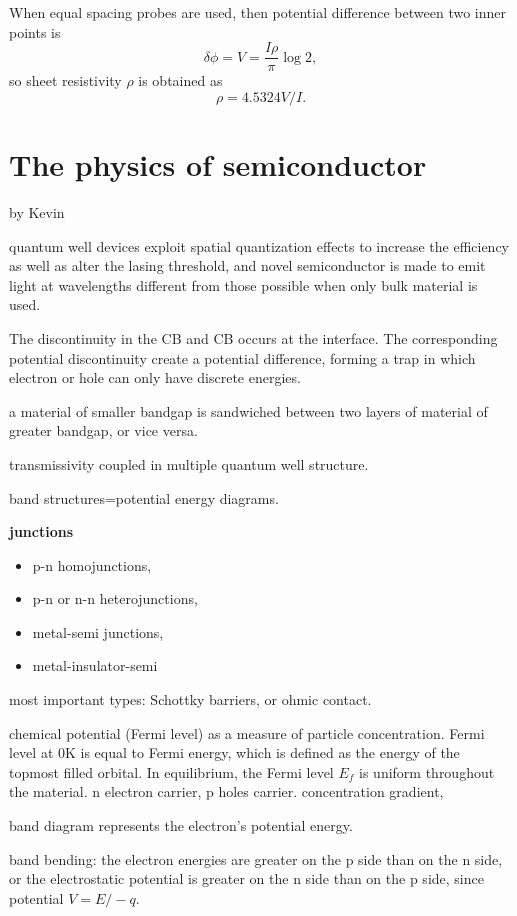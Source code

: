 When equal spacing probes are used, then potential difference between two inner points is 
\[
\delta\phi = V = \frac{I \rho}{\pi}\log2,
\]
so sheet resistivity $\rho$ is obtained as
\[
\rho = 4.5324V/I.
\]


\section{The physics of semiconductor}

by Kevin

quantum well devices exploit spatial quantization effects to increase the efficiency as well as alter the lasing threshold, and novel semiconductor is made to emit light at wavelengths different from those possible when only bulk material is used.

The discontinuity in the CB and CB occurs at the interface. The corresponding potential discontinuity create a potential difference, forming a trap in which electron or hole can only have discrete energies.

a material of smaller bandgap is sandwiched between two layers of material of greater bandgap, or vice versa.

transmissivity coupled in multiple quantum well structure.

band structures=potential energy diagrams.

\textbf{junctions}
\begin{itemize}
\item p-n homojunctions,
\item p-n or n-n heterojunctions,
\item metal-semi junctions, 
\item metal-insulator-semi 
\end{itemize}

most important types: Schottky barriers, or ohmic contact.

chemical potential (Fermi level) as a measure of particle concentration.  Fermi level at 0K is equal to Fermi energy, which is defined as the energy of the topmost filled orbital. In equilibrium, the Fermi level $E_f$ is uniform throughout the material. n electron carrier, p holes carrier. concentration gradient, 

band diagram represents the electron's potential energy.

band bending: the electron energies are greater on the p side than on the n side, or the electrostatic potential is greater on the n side than on the p side, since potential $V = E/-q$.

